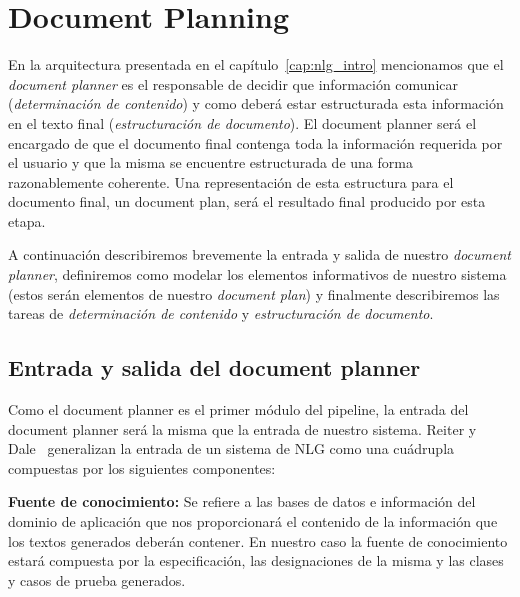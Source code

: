 \chapter{Document Planning}

En la arquitectura presentada en el capítulo~\ref{cap:nlg_intro} mencionamos que el \emph{document planner} es el responsable de decidir que información comunicar (\emph{determinación de contenido}) y como deberá estar estructurada esta información en el texto final (\emph{estructuración de documento}). El document planner será el encargado de que el documento final contenga toda la información requerida por el usuario y que la misma se encuentre estructurada de una forma razonablemente coherente. Una representación de esta estructura para el documento final, un document plan, será el resultado final producido por esta etapa.

A continuación describiremos brevemente la entrada y salida de nuestro \emph{document planner}, definiremos como modelar los elementos informativos de nuestro sistema (estos serán elementos de nuestro \emph{document plan}) y finalmente describiremos las tareas de \emph{determinación de contenido} y \emph{estructuración de documento}.

\section{Entrada y salida del document planner}
Como el document planner es el primer módulo del pipeline, la entrada del document planner será la misma que la entrada de nuestro sistema. Reiter y Dale~\cite{reiter_dale} generalizan la entrada de un sistema de NLG  como una cuádrupla compuestas por los siguientes componentes:

\bigskip
\noindent
\textbf{Fuente de conocimiento:} Se refiere a las bases de datos e información del dominio de aplicación que nos proporcionará el contenido de la información que los textos generados deberán contener.
En nuestro caso la fuente de conocimiento estará compuesta por la especificación, las designaciones de la misma y las clases y casos de prueba generados.


